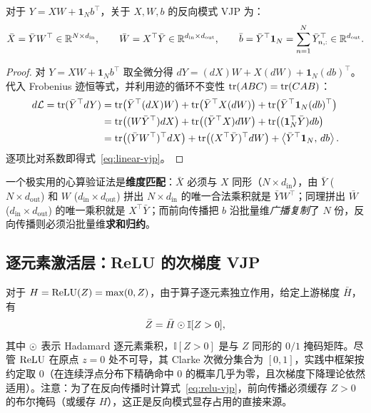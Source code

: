 \begin{thmBox}
\begin{proposition}
\label{prop:linear-vjp}
对于 $Y = XW + \mathbf{1}_N b^\top$，关于 $X, W, b$ 的反向模式 VJP 为：
\begin{equation}
  \bar{X} = \bar{Y} W^\top \in \mathbb{R}^{N \times d_{\text{in}}}, \qquad
  \bar{W} = X^\top \bar{Y} \in \mathbb{R}^{d_{\text{in}} \times d_{\text{out}}}, \qquad
  \bar{b} = \bar{Y}^\top \mathbf{1}_N = \sum_{n=1}^{N} \bar{Y}_{n,:}^\top \in \mathbb{R}^{d_{\text{out}}}.
  \label{eq:linear-vjp}
\end{equation}
\end{proposition}
\begin{proof}
对 $Y = XW + \mathbf{1}_N b^\top$ 取全微分得 $dY = (dX) W + X (dW) + \mathbf{1}_N (db)^\top$。代入 Frobenius 迹恒等式，并利用迹的循环不变性 $\operatorname{tr}(ABC) = \operatorname{tr}(CAB)$：
\begin{align*}
  d\mathcal{L} = \tr(\bar{Y}^\top dY)
  &= \tr\!\left(\bar{Y}^\top (dX) W\right) + \tr\!\left(\bar{Y}^\top X (dW)\right) + \tr\!\left(\bar{Y}^\top \mathbf{1}_N (db)^\top\right) \\
  &= \tr\!\left((W \bar{Y}^\top) dX\right) + \tr\!\left((\bar{Y}^\top X) dW\right) + \tr\!\left((\mathbf{1}_N^\top \bar{Y}) db\right) \\
  &= \tr\!\left((\bar{Y} W^\top)^\top dX\right) + \tr\!\left((X^\top \bar{Y})^\top dW\right) + \inner{\bar{Y}^\top \mathbf{1}_N}{db}.
\end{align*}
逐项比对系数即得式~\eqref{eq:linear-vjp}。
\end{proof}
\end{thmBox}

一个极实用的心算验证法是\textbf{维度匹配}：$\bar{X}$ 必须与 $X$ 同形（$N \times d_{\text{in}}$），由 $\bar{Y}$ ($N \times d_{\text{out}}$) 和 $W$ ($d_{\text{in}} \times d_{\text{out}}$) 拼出 $N \times d_{\text{in}}$ 的唯一合法乘积就是 $\bar{Y} W^\top$；同理拼出 $\bar{W}$ ($d_{\text{in}} \times d_{\text{out}}$) 的唯一乘积就是 $X^\top \bar{Y}$；而前向传播把 $b$ 沿批量维\emph{广播复制}了 $N$ 份，反向传播则必须沿批量维\textbf{求和归约}。

\subsection{逐元素激活层：ReLU 的次梯度 VJP}

对于 $H = \operatorname{ReLU}(Z) = \max(0, Z)$，由于算子逐元素独立作用，给定上游梯度 $\bar{H}$，有
\begin{equation}
  \bar{Z} = \bar{H} \odot \mathbb{I}[Z > 0],
  \label{eq:relu-vjp}
\end{equation}
其中 $\odot$ 表示 Hadamard 逐元素乘积，$\mathbb{I}[Z > 0]$ 是与 $Z$ 同形的 $0/1$ 掩码矩阵。尽管 $\operatorname{ReLU}$ 在原点 $z = 0$ 处不可导，其 Clarke 次微分集合为 $[0, 1]$，实践中框架按约定取 $0$（在连续浮点分布下精确命中 $0$ 的概率几乎为零，且次梯度下降理论依然适用）。注意：为了在反向传播时计算式~\eqref{eq:relu-vjp}，前向传播必须缓存 $Z > 0$ 的布尔掩码（或缓存 $H$），这正是反向模式显存占用的直接来源。

